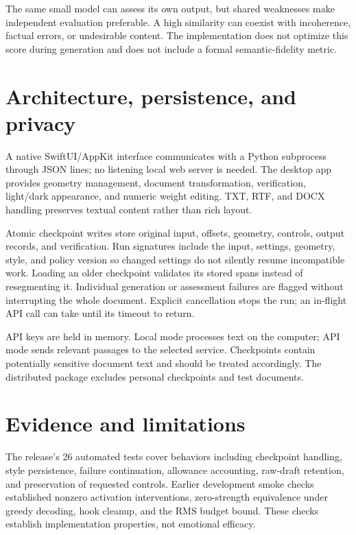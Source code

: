 \documentclass[manuscript,screen,nonacm]{acmart}
\begin{document}
The same small model can assess its own output, but shared weaknesses
make independent evaluation preferable. A high similarity can coexist
with incoherence, factual errors, or undesirable content. The
implementation does not optimize this score during generation and does
not include a formal semantic-fidelity metric.


\section{Architecture, persistence, and
privacy}\label{architecture-persistence-and-privacy}

A native SwiftUI/AppKit interface communicates with a Python subprocess
through JSON lines; no listening local web server is needed. The desktop
app provides geometry management, document transformation, verification,
light/dark appearance, and numeric weight editing. TXT, RTF, and DOCX
handling preserves textual content rather than rich layout.

Atomic checkpoint writes store original input, offsets, geometry,
controls, output records, and verification. Run signatures include the
input, settings, geometry, style, and policy version so changed settings
do not silently resume incompatible work. Loading an older checkpoint
validates its stored spans instead of resegmenting it. Individual
generation or assessment failures are flagged without interrupting the
whole document. Explicit cancellation stops the run; an in-flight API
call can take until its timeout to return.

API keys are held in memory. Local mode processes text on the computer;
API mode sends relevant passages to the selected service. Checkpoints
contain potentially sensitive document text and should be treated
accordingly. The distributed package excludes personal checkpoints and
test documents.

\section{Evidence and limitations}\label{evidence-and-limitations}

The release's 26 automated tests cover behaviors including checkpoint
handling, style persistence, failure continuation, allowance accounting,
raw-draft retention, and preservation of requested controls. Earlier
development smoke checks established nonzero activation interventions,
zero-strength equivalence under greedy decoding, hook cleanup, and the
RMS budget bound. These checks establish implementation properties, not
emotional efficacy.
\end{document}
